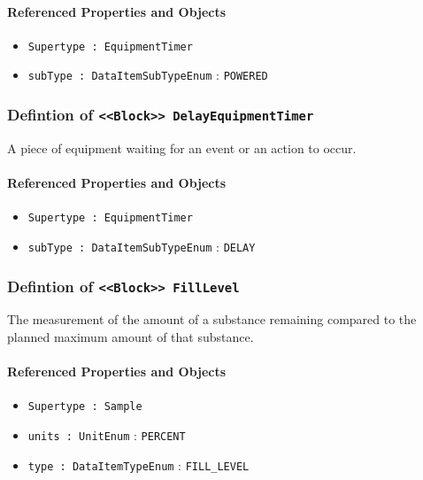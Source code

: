 \FloatBarrier
\paragraph{Referenced Properties and Objects}

\begin{itemize}
\item \texttt{Supertype : EquipmentTimer}

\item \texttt{subType : DataItemSubTypeEnum} : \texttt{POWERED}

\end{itemize}
\FloatBarrier
\subsubsection{Defintion of \texttt{<<Block>> DelayEquipmentTimer}}
  \label{type:DelayEquipmentTimer}

\FloatBarrier

A piece of equipment waiting for an event or an action to occur.

\FloatBarrier
\paragraph{Referenced Properties and Objects}

\begin{itemize}
\item \texttt{Supertype : EquipmentTimer}

\item \texttt{subType : DataItemSubTypeEnum} : \texttt{DELAY}

\end{itemize}
\FloatBarrier
\subsubsection{Defintion of \texttt{<<Block>> FillLevel}}
  \label{type:FillLevel}

\FloatBarrier

The measurement of the amount of a substance remaining compared to the planned maximum amount of that substance.

\FloatBarrier
\paragraph{Referenced Properties and Objects}

\begin{itemize}
\item \texttt{Supertype : Sample}

\item \texttt{units : UnitEnum} : \texttt{PERCENT}

\item \texttt{type : DataItemTypeEnum} : \texttt{FILL_LEVEL}

\end{itemize}
\FloatBarrier
